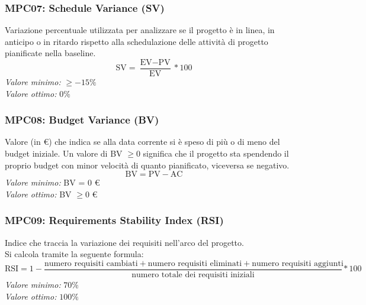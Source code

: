 \subsubsection{MPC07: Schedule Variance (SV)}
Variazione percentuale utilizzata per analizzare se il progetto è in linea, in anticipo o in ritardo rispetto alla schedulazione delle attività di progetto pianificate nella baseline.
\begin{equation*}
\text{SV}=\frac{\text{EV}-\text{PV}}{\text{EV}}*100
\end{equation*}
\textit{Valore minimo:} $\ge -15\%$\\
\textit{Valore ottimo:} 0\%
\subsubsection{MPC08: Budget Variance (BV)}
Valore (in \euro) che indica se alla data corrente si è speso di più o di meno del budget iniziale. Un valore di BV $\ge 0$ significa che il progetto sta spendendo il proprio budget con minor velocità di quanto pianificato, viceversa se negativo.
\begin{equation*}
\text{BV}=\text{PV}-\text{AC}
\end{equation*}
\textit{Valore minimo:} BV = 0 \euro\\
\textit{Valore ottimo:} BV $\ge 0 $ \euro

\subsubsection{MPC09: Requirements Stability Index (RSI)}
Indice che traccia la variazione dei requisiti nell'arco del progetto.\\
Si calcola tramite la seguente formula:
\begin{equation*}
\text{RSI}=1-\frac{\text{numero requisiti cambiati}+\text{numero requisiti eliminati}+\text{numero requisiti aggiunti}}{\text{numero totale dei requisiti iniziali}}*100
\end{equation*}
\textit{Valore minimo:} $70\%$\\
\textit{Valore ottimo:} $100\%$

